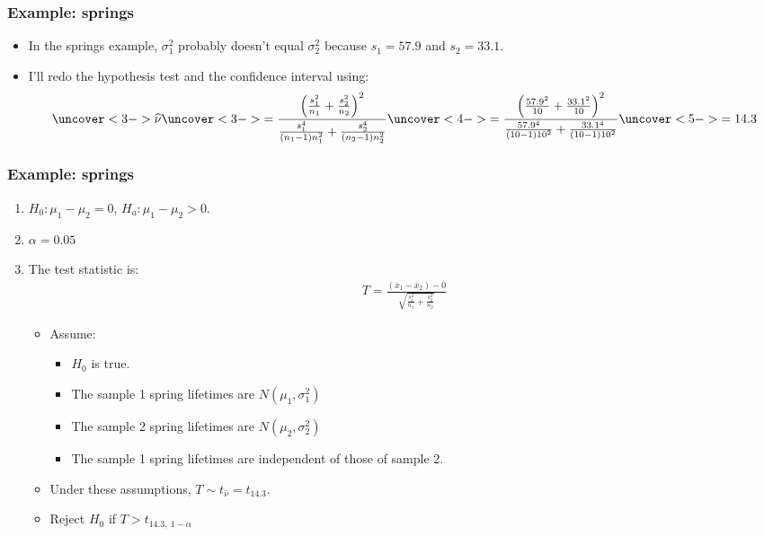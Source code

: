 \documentclass[handout]{beamer}\usepackage[]{graphicx}\usepackage[]{color}
\providecommand{\ov}[1]{\overline{#1}}
\providecommand{\wh}[1]{\widehat{#1}}
\numberwithin{equation}{section}
\begin{document}
\begin{frame}
\frametitle{Example: springs}
\begin{itemize}
\item In the springs example, $\sigma_1^2$ probably doesn't equal $\sigma_2^2$ because $s_1 = 57.9$ and $s_2 = 33.1$.
\pause \item I'll redo the hypothesis test and the confidence interval using: 
\begin{align*}
\uncover<3->{\wh{\nu}} \uncover<3->{= \frac{\left (\frac{s_1^2}{n_1} + \frac{s_2^2}{n_2} \right )^2}{\frac{s_1^4}{(n_1 - 1)n_1^2} + \frac{s_2^4}{(n_2 - 1)n_2^2}}} \uncover<4->{ = \frac{\left (\frac{57.9^2}{10} + \frac{33.1^2}{10} \right )^2}{\frac{57.9^4}{(10 - 1)10^2} + \frac{33.1^4}{(10 - 1)10^2}}} \uncover<5->{ =14.3}
\end{align*}
\end{itemize}
\end{frame}



\begin{frame}
\frametitle{Example: springs}
\begin{enumerate}[1. ]
\item $H_0:  \mu_1 - \mu_2 = 0$, $H_a: \mu_1 - \mu_2 > 0$.
\pause \item $\alpha = 0.05$
\pause \item The test statistic is:
\pause \begin{align*}
T = \frac{(\ov{x}_1 - \ov{x}_2) - 0}{ \sqrt{\frac{s_1^2}{n_1} + \frac{s_2^2}{n_2}}} 
\end{align*}
\begin{itemize}
\pause \item Assume:
\begin{itemize}
\pause \item $H_0$ is true.
\pause \item The sample 1 spring lifetimes are $N(\mu_1, \sigma^2_1)$
\pause \item The sample 2 spring lifetimes are $N(\mu_2, \sigma^2_2)$
\pause \item The sample 1 spring lifetimes are independent of those of sample 2.
\end{itemize}
\pause \item Under these assumptions, $T \sim t_{\wh{\nu}} = t_{14.3}$.
\pause \item Reject $H_0$ if $T > t_{14.3, \ 1 - \alpha}$
\end{itemize}
\setcounter{saveenum}{\value{enumi}}

\end{enumerate}
\end{frame}
\end{document}
